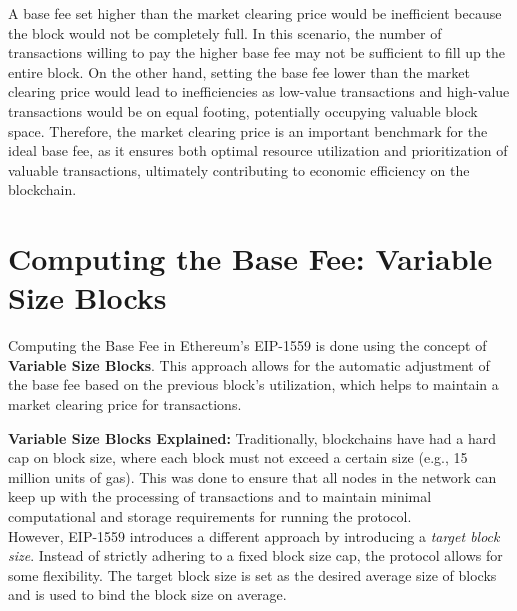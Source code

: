 A base fee set higher than the market clearing price would be inefficient because the block would not be completely full. In this scenario, the number of transactions willing to pay the higher base fee may not be sufficient to fill up the entire block. On the other hand, setting the base fee lower than the market clearing price would lead to inefficiencies as low-value transactions and high-value transactions would be on equal footing, potentially occupying valuable block space. Therefore, the market clearing price is an important benchmark for the ideal base fee, as it ensures both optimal resource utilization and prioritization of valuable transactions, ultimately contributing to economic efficiency on the blockchain.

\section{Computing the Base Fee: Variable Size Blocks}
Computing the Base Fee in Ethereum's EIP-1559 is done using the concept of \textbf{Variable Size Blocks}. This approach allows for the automatic adjustment of the base fee based on the previous block's utilization, which helps to maintain a market clearing price for transactions.

\noindent
\textbf{Variable Size Blocks Explained:}
Traditionally, blockchains have had a hard cap on block size, where each block must not exceed a certain size (e.g., 15 million units of gas). This was done to ensure that all nodes in the network can keep up with the processing of transactions and to maintain minimal computational and storage requirements for running the protocol.\\
However, EIP-1559 introduces a different approach by introducing a \textit{target block size}. Instead of strictly adhering to a fixed block size cap, the protocol allows for some flexibility. The target block size is set as the desired average size of blocks and is used to bind the block size on average.


